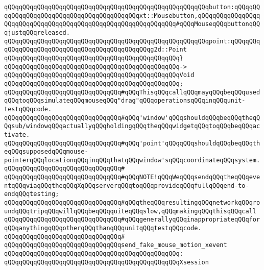 \verb|qQQqqQQqqQQqqQQqqQQqqQQqqQQqqQQqqQQqqQQqqQQqqQQqqQQqqQQqbutton:qQQqqQQqqQQqqQQqqQQqqQQqqQQqqQQqqQQqqQQqqQQqxt::Mousebutton,qQQqqQQqqQQqqQQqqQQqqQQqqQQqqQQqqQQqqQQqqQQqqQQqqQQqqQQqqQQqqQQq#qQQqMouseqQQqbuttonqQQqjustqQQqreleased.|\newline
\verb|qQQqqQQqqQQqqQQqqQQqqQQqqQQqqQQqqQQqqQQqqQQqqQQqqQQqqQQqpoint:qQQqqQQqqQQqqQQqqQQqqQQqqQQqqQQqqQQqqQQqqQQqqQQqg2d::Point|\newline
\verb|qQQqqQQqqQQqqQQqqQQqqQQqqQQqqQQqqQQqqQQqqQQqqQQq}|\newline
\verb|qQQqqQQqqQQqqQQqqQQqqQQqqQQqqQQqqQQqqQQqqQQqqQQq->|\newline
\verb|qQQqqQQqqQQqqQQqqQQqqQQqqQQqqQQqqQQqqQQqqQQqqQQqVoid|\newline
\verb|qQQqqQQqqQQqqQQqqQQqqQQqqQQqqQQqqQQqqQQqqQQqqQQq;|\newline
\newline
\verb|qQQqqQQqqQQqqQQqqQQqqQQqqQQqqQQq#qQQqThisqQQqcallqQQqmayqQQqbeqQQqusedqQQqtoqQQqsimulateqQQqmouseqQQq"drag"qQQqoperationsqQQqinqQQqunit-testqQQqcode.|\newline
\verb|qQQqqQQqqQQqqQQqqQQqqQQqqQQqqQQq#qQQq'window'qQQqshouldqQQqbeqQQqtheqQQqsub/windowqQQqactuallyqQQqholdingqQQqtheqQQqwidgetqQQqtoqQQqbeqQQqactivate.|\newline
\verb|qQQqqQQqqQQqqQQqqQQqqQQqqQQqqQQq#qQQq'point'qQQqqQQqshouldqQQqbeqQQqtheqQQqsupposedqQQqmouse-pointerqQQqlocationqQQqinqQQqthatqQQqwindow'sqQQqcoordinateqQQqsystem.|\newline
\verb|qQQqqQQqqQQqqQQqqQQqqQQqqQQqqQQq#|\newline
\verb|qQQqqQQqqQQqqQQqqQQqqQQqqQQqqQQq#qQQqNOTE!qQQqWeqQQqsendqQQqtheqQQqeventqQQqviaqQQqtheqQQqXqQQqserverqQQqtoqQQqprovideqQQqfullqQQqend-to-endqQQqtesting;|\newline
\verb|qQQqqQQqqQQqqQQqqQQqqQQqqQQqqQQq#qQQqtheqQQqresultingqQQqnetworkqQQqroundqQQqtripqQQqwillqQQqbeqQQqquiteqQQqslow,qQQqmakingqQQqthisqQQqcall|\newline
\verb|qQQqqQQqqQQqqQQqqQQqqQQqqQQqqQQq#qQQqgenerallyqQQqinappropriateqQQqforqQQqanythingqQQqotherqQQqthanqQQqunitqQQqtestqQQqcode.|\newline
\verb|qQQqqQQqqQQqqQQqqQQqqQQqqQQqqQQq#|\newline
\verb|qQQqqQQqqQQqqQQqqQQqqQQqqQQqqQQqsend_fake_mouse_motion_xevent|\newline
\verb|qQQqqQQqqQQqqQQqqQQqqQQqqQQqqQQqqQQqqQQqqQQqqQQq:|\newline
\verb|qQQqqQQqqQQqqQQqqQQqqQQqqQQqqQQqqQQqqQQqqQQqqQQqXsession|\newline

